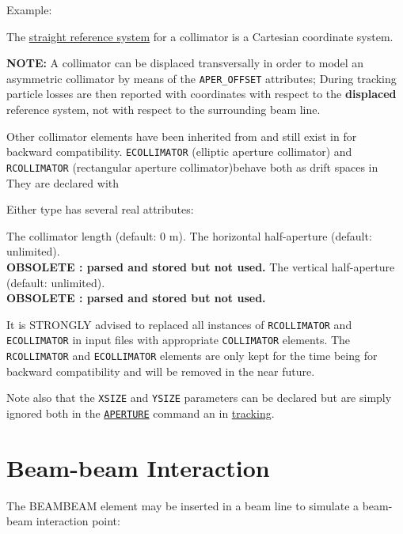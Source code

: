 {\begin{5.02.05}
Example: 

The \hyperref[subsec:local_straight]{straight reference system} for a
collimator is a Cartesian coordinate system.  

\textbf{NOTE:} A collimator can be displaced transversally in order to
model an asymmetric collimator by means of the {\tt APER\_OFFSET} attributes; 
During tracking particle losses are then reported with coordinates with respect 
to the \textbf{displaced} reference system, not with respect to the surrounding 
beam line.


Other collimator elements have been inherited from \madeight and still exist 
in \madx for backward compatibility.
{\tt ECOLLIMATOR} (elliptic aperture collimator) and {\tt RCOLLIMATOR} 
(rectangular aperture collimator)behave both as drift spaces in \madx 
They are declared with


Either type has several real attributes: 
\begin{madlist}
	 The collimator length (default: 0 m). 
	 The horizontal half-aperture (default:
	unlimited). \\ \textbf{OBSOLETE : parsed and stored but not used.} 
	 The vertical half-aperture (default:
	unlimited). \\ \textbf{OBSOLETE : parsed and stored but not used.} 
\end{madlist}

It is STRONGLY advised to replaced all instances of {\tt RCOLLIMATOR} 
and {\tt ECOLLIMATOR} in input files with appropriate {\tt COLLIMATOR} 
elements. The {\tt RCOLLIMATOR} and {\tt ECOLLIMATOR} elements are only
kept for the time being for backward compatibility and will be removed in 
the near future. 

Note also that the {\tt XSIZE} and {\tt YSIZE} parameters can be declared 
but are simply ignored both in the \hyperref[chap:aperture]{\tt APERTURE}
command an in \hyperref[chap:thintrack]{tracking}. 

\end{5.02.05}



\section{Beam-beam Interaction}
The BEAMBEAM element may be inserted in a beam line to simulate a
beam-beam interaction point:  
 
}
